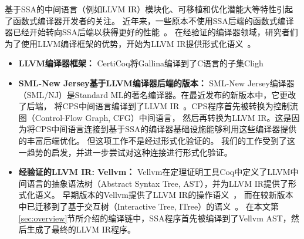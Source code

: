 基于SSA的中间语言（例如LLVM IR）模块化、可移植和优化潜能大等特性引起了函数式编译器开发者的关注。
近年来，一些原本不使用SSA后端的函数式编译器已经开始转向SSA后端以获得更好的性能~\cite{farvardin2020new}。
在经验证的编译器领域，研究者们为了使用LLVM编译框架的优势，开始为LLVM IR提供形式化语义~\cite{zhao2012formalizing}。

\begin{itemize}
    \item \textbf{LLVM编译器框架：} 
    CertiCoq将Gallina编译到了C语言的子集Cligh
    \item \textbf{SML-New Jersey基于LLVM编译器后端的版本：} 
    SML-New Jersey编译器（SML/NJ）是Standard ML的著名编译器。在最近发布的新版本中，它更改了后端，
    将CPS中间语言编译到了LLVM IR~\cite{farvardin2020new}。CPS程序首先被转换为控制流图（Control-Flow Graph, CFG）中间语言，
    然后再转换为LLVM IR。这是因为将CPS中间语言连接到基于SSA的编译器基础设施能够利用这些编译器提供的丰富后端优化。
    但这项工作不是经过形式化验证的。
    我们的工作受到了这一趋势的启发，并进一步尝试对这种连接进行形式化验证。
    \item \textbf{经验证的LLVM IR: Vellvm：} 
    Vellvm在定理证明工具Coq中定义了LLVM中间语言的抽象语法树（Abstract Syntax Tree, AST），并为LLVM IR提供了形式化语义。
    早期版本的Vellvm提供了LLVM IR的操作语义~\cite{zhao2012formalizing}，
    而在较新版本中已迁移到了基于交互树（Interactive Tree, ITree）的语义~\cite{zakowski2021modular}。
    在本文第\ref{sec:overview}节所介绍的编译链中，SSA程序首先被编译到了Vellvm AST，然后生成了最终的LLVM IR程序。
\end{itemize}
